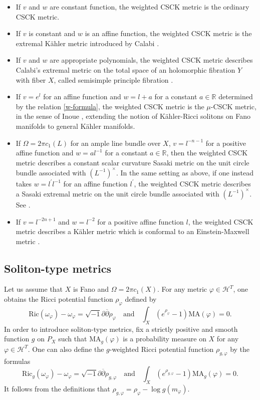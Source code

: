 \documentclass[12pt]{amsart}
\numberwithin{equation}{section}%
\theoremstyle{plain}
\theoremstyle{definition}
\newcommand{\deldel}{\sqrt{-1}\partial \overline{\partial}}
\newcommand{\Ric}{\mathrm{Ric}}
\newcommand{\MA}{\mathrm{MA}}
\renewcommand{\phi}{\varphi}
\newcommand{\1}{\mathbf{1}}
\begin{document}
\begin{itemize}
\item If $v$ and $w$ are constant function, the weighted CSCK metric
is the ordinary CSCK metric.
\item If $v$ is constant and $w$ is an affine function, the weighted CSCK metric
is the extremal K\"ahler metric introduced by Calabi \cite{Ca82}.
\item If $v$ and $w$ are appropriate polynomials, 
the weighted CSCK metric describes Calabi's extremal metric
on the total space of an holomorphic fibration $Y$ with fiber $X$,
called semisimple principle fibration \cite{ACGT11, AJL23, Jub23}.
\item If $v=e^{l}$ for an affine function and $w=l+a$ for a constant
$a\in\mathbb{R}$ determined by the relation \eqref{w-formula},
the weighted CSCK metric is the $\mu$-CSCK metric,
in the sense of Inoue \cite{Ino22},
extending the notion of K\"ahler-Ricci solitons on Fano manifolds
to general K\"ahler manifolds.
\item If $\Omega=2\pi c_{1}(L)$ for an ample line bundle over $X$, 
$v=l^{-n-1}$ for a positive affine function
and $w=al^{-1}$ for a constant $a\in\mathbb{R}$,
then the weighted CSCK metric describes
a constant scalar curvature Sasaki metric
on the unit circle bundle associated with $(L^{-1})^{\times}$.
In the same setting as above, if one instead takes $w=l^{\prime}l^{-1}$
for an affine function $l^{\prime}$, the weighted CSCK metric
describes a Sasaki extremal metric
on the unit circle bundle associated with $(L^{-1})^{\times}$.
See \cite{AC21, ACL21}.
\item If $v=l^{-2n+1}$ and $w=l^{-2}$ for a positive affine function $l$,
the weighted CSCK metric describes a K\"ahler metric
which is conformal to an Einstein-Maxwell metric \cite{AM19}.
\end{itemize}
\subsection{Soliton-type metrics}
Let us
assume that $X$ is Fano and $\Omega=2\pi c_{1}(X)$.
For any metric $\phi\in\mathcal{H}^{T}$,
one obtains the Ricci potential function $\rho_{\phi}$ defined by
\begin{equation}
\Ric(\omega_{\phi})-\omega_{\phi}=\deldel\rho_{\phi}
    \quad\text{and}\quad
    \int_{X}(e^{\rho_{\phi}}-1)\MA(\phi)=0.
\end{equation}
In order to introduce soliton-type metrics,
fix a strictly positive and smooth function $g$ on $P_{X}$
such that $\MA_{g}(\phi)$ is a probability measure on $X$
for any $\phi\in\mathcal{H}^{T}$.
One can also define the $g$-weighted Ricci potential function
$\rho_{g,\phi}$ by the formulas
\begin{equation}\label{Ricg}
\Ric_{g}(\omega_{\phi})-\omega_{\phi}=\deldel\rho_{g,\phi}
    \quad\text{and}\quad
    \int_{X}(e^{\rho_{g,\phi}}-1)\MA_{g}(\phi)=0.
\end{equation}
It follows from the definitions that
$\rho_{g,\phi}=\rho_{\phi}-\log g(m_{\phi})$.
\end{document}

